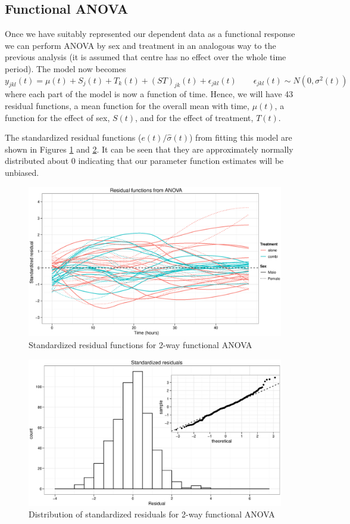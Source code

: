 \subsection{Functional ANOVA}
Once we have suitably represented our dependent data as a functional response we can perform ANOVA by sex and treatment in an analogous way to the previous analysis (it is assumed that centre has no effect over the whole time period). The model now becomes
\begin{equation}
y_{jkl}(t)=\mu(t)+S_{j}(t)+T_{k}(t)+(ST)_{jk}(t)+\epsilon_{jkl}(t)\quad\quad\epsilon_{jkl}(t)\sim N(0, \sigma^{2}(t))\label{aovfda}
\end{equation}
where each part of the model is now a function of time. Hence, we will have 43 residual functions, a mean function for the overall mean with time, $\mu(t)$, a function for the effect of sex, $S(t)$, and for the effect of treatment, $T(t)$.

The standardized residual functions ($e(t)/\hat{\sigma}(t)$) from fitting this model are shown in Figures \ref{fdaresids} and \ref{fdahistqq}. It can be seen that they are approximately normally distributed about 0 indicating that our parameter function estimates will be unbiased.
\begin{figure}[p]
\includegraphics[width=150mm]{fdaresids.eps} 
\caption{Standardized residual functions for 2-way functional ANOVA}
\label{fdaresids}
\end{figure}
\begin{figure}[p]
\includegraphics[width=150mm]{fdahistqq.eps} 
\caption{Distribution of standardized residuals for 2-way functional ANOVA}
\label{fdahistqq}
\end{figure}

